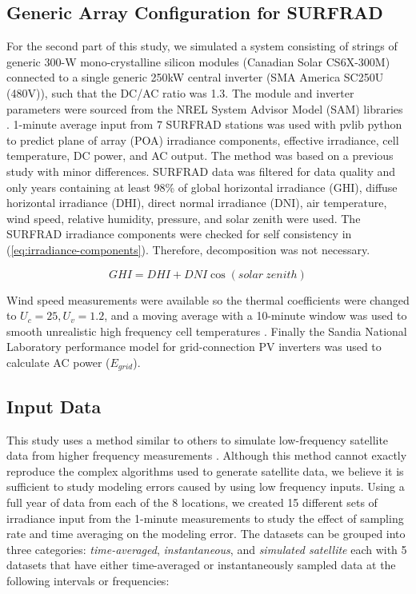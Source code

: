 \documentclass[conference]{IEEEtran}
\begin{document}
\subsection{Generic Array Configuration for SURFRAD}
For the second part of this study, we simulated a system consisting of strings of generic 300-W mono-crystalline silicon modules (Canadian Solar CS6X-300M) connected to a single generic 250kW central inverter (SMA America SC250U (480V)), such that the DC/AC ratio was 1.3. The module and inverter parameters were sourced from the NREL System Advisor Model (SAM) libraries \cite{Freeman2018}. 1-minute average input from 7 SURFRAD \cite{Augustine2000} stations was used with pvlib python \cite{pvlib2018} to predict plane of array (POA) irradiance components, effective irradiance, cell temperature, DC power, and AC output. The method was based on a previous study \cite{9519024} with minor differences. SURFRAD data was filtered for data quality and only years containing at least 98\% of global horizontal irradiance (GHI), diffuse horizontal irradiance (DHI), direct normal irradiance (DNI), air temperature, wind speed, relative humidity, pressure, and solar zenith were used. The SURFRAD irradiance components were checked for self consistency in (\ref{eq:irradiance-components}). Therefore, decomposition was not necessary.

\begin{equation}
\mathit{GHI} = \mathit{DHI} + \mathit{DNI} \cos{\left(\mathit{solar\ zenith}\right)}
\label{eq:irradiance-components}
\end{equation}

Wind speed measurements were available so the thermal coefficients were changed to $U_c=25, U_v=1.2$, and a moving average with a 10-minute window was used to smooth unrealistic high frequency cell temperatures \cite{9095219}. Finally the Sandia National Laboratory performance model for grid-connection PV inverters \cite{King2007} was used to calculate AC power ($E_{grid}$).

\subsection{Input Data}
This study uses a method similar to others to simulate low-frequency satellite data from higher frequency measurements \cite{Bowersox2021}. Although this method cannot exactly reproduce the complex algorithms used to generate satellite data, we believe it is sufficient to study modeling errors caused by using low frequency inputs. Using a full year of data from each of the 8 locations, we created 15 different sets of irradiance input from the 1-minute measurements to study the effect of sampling rate and time averaging on the modeling error. The datasets can be grouped into three categories: \emph{time-averaged}, \emph{instantaneous}, and \emph{simulated satellite} each with 5 datasets that have either time-averaged or instantaneously sampled data at the following intervals or frequencies:
\end{document}
